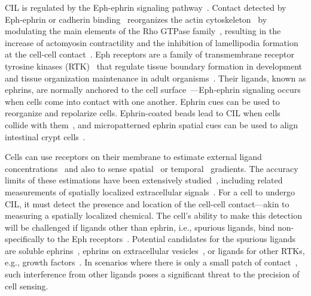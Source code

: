 CIL is regulated by the Eph-ephrin signaling pathway~\cite{davis2012emergence, larranaga2022ephrin, zapata2022efficacy, lisabeth2013eph}.
Contact detected by Eph-ephrin or cadherin binding~\cite{roycroft2016molecular, noordstra2023cadherin} reorganizes the actin cytoskeleton~\cite{klein2012eph} by modulating the main elements of the Rho GTPase family~\cite{noren2004eph, arvanitis2008eph}, resulting in the increase of actomyosin contractility and the inhibition of lamellipodia formation at the cell-cell contact~\cite{pasquale2008eph, larranaga2022ephrin}.
Eph receptors are a family of transmembrane receptor tyrosine kinases (RTK)~\cite{zapata2022efficacy, larranaga2022ephrin} that regulate tissue boundary formation in development~\cite{cayuso2015mechanisms} and tissue organization maintenance in adult organisms~\cite{larranaga2022ephrin}.
Their ligands, known as ephrins, are normally anchored to the cell surface~\cite{zapata2022efficacy, larranaga2022ephrin, lin2015interplay}---Eph-ephrin signaling occurs when cells come into contact with one another.
Ephrin cues can be used to reorganize and repolarize cells.
Ephrin-coated beads lead to CIL when cells collide with them~\cite{lin2015interplay}, and micropatterned ephrin spatial cues can be used to align intestinal crypt cells~\cite{larranaga2022ephrin}.

Cells can use receptors on their membrane to estimate external ligand concentrations~\cite{singh2020universal, carballo2019receptor, berg1977physics} and also to sense spatial~\cite{hu2011how, wasnik2019accuracy, hopkins2020chemotaxis, ipina2022collective, hu2010physical, nwogbaga2023physical} or temporal~\cite{mora2010limits} gradients.
The accuracy limits of these estimations have been extensively studied~\cite{carballo2019receptor, hu2011how, wasnik2019accuracy, hopkins2020chemotaxis, ipina2022collective}, including related measurements of spatially localized extracellular signals~\cite{wasnik2019accuracy}.
For a cell to undergo CIL, it must detect the presence and location of the cell-cell contact---akin to measuring a spatially localized chemical.
The cell's ability to make this detection will be challenged if ligands other than ephrin, i.e., spurious ligands, bind non-specifically to the Eph receptors~\cite{mora2015physical, singh2017simple, feinerman2008quantitative, chylek2014interaction}.
Potential candidates for the spurious ligands are soluble ephrins~\cite{wykosky2008soluble}, ephrins on extracellular vesicles~\cite{gong2016exosomes}, or ligands for other RTKs, e.g., growth factors~\cite{minami2011ephrina}.
In scenarios where there is only a small patch of contact~\cite{singh2021rules}, such interference from other ligands poses a significant threat to the precision of cell sensing.

